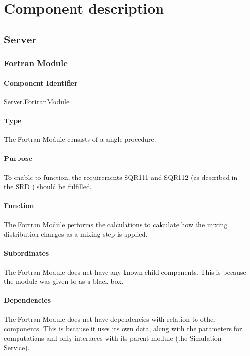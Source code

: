 \chapter{Component description}
\label{chap:compdescr}

\section{Server}

\subsection{Fortran Module}

\subsubsection*{Component Identifier}
Server.FortranModule

\subsubsection*{Type}
The Fortran Module consists of a single procedure.

\subsubsection*{Purpose}
To enable \projectname to function, the requirements SQR111 and SQR112 (as described in the SRD \cite{srd}) should be fulfilled.

\subsubsection*{Function}
The Fortran Module performs the calculations to calculate how the mixing distribution changes as a mixing step is applied.

\subsubsection*{Subordinates}
The Fortran Module does not have any known child components. This is because the module was given to \projectauthor as a black box.

\subsubsection*{Dependencies}
The Fortran Module does not have dependencies with relation to other components. This is because it uses its own data, along with the parameters for computations and only interfaces with its parent module (the Simulation Service).

